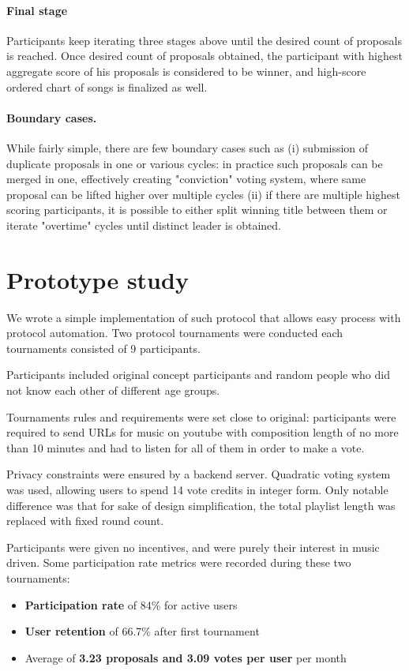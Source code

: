 \documentclass{article}
\begin{document}
\begin{CJK}{UTF8}{gbsn}
\begin{multicols}{2}
        \paragraph{Final stage}Participants keep iterating three stages above until the desired count of proposals is reached. Once desired count of proposals obtained, the participant with highest aggregate score of his proposals is considered to be winner, and high-score ordered chart of songs is finalized as well.
        \paragraph{Boundary cases.} While fairly simple, there are few boundary cases such as (i) submission of duplicate proposals in one or various cycles: in practice such proposals can be merged in one, effectively creating "conviction" voting system, where same proposal can be lifted higher over multiple cycles (ii) if there are multiple highest scoring participants, it is possible to either split winning title between them or iterate "overtime" cycles until distinct leader is obtained.


        \section{Prototype study}
        We wrote a simple implementation of such protocol that allows easy process with protocol automation. Two protocol tournaments were conducted each tournaments consisted of 9 participants.

        Participants included original concept participants and random people who did not know each other of different age groups.

        Tournaments rules and requirements were set close to original: participants were required to send URLs for music on youtube with composition length of no more than 10 minutes and had to listen for all of them in order to make a vote.

        Privacy constraints were ensured by a backend server. Quadratic voting system was used, allowing users to spend 14 vote credits in integer form. Only notable difference  was that for sake of design simplification, the total playlist length was replaced with fixed round count.

        Participants were given no incentives, and were purely their interest in music driven. Some participation rate metrics were recorded during these two tournaments:
        \begin{itemize}[nosep]
            \item \textbf{Participation rate} of 84\% for active users
            \item \textbf{User retention} of 66.7\% after first tournament
            \item Average of \textbf{3.23 proposals and 3.09 votes per user} per month
        \end{itemize}


\end{multicols}
\end{CJK}
\end{document}
